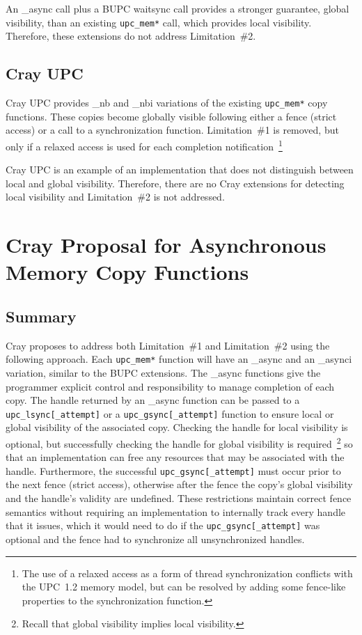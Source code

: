 \documentclass[10pt]{article}
\def \memstar {{\tt upc\_mem*}}
\def \gsync  {{\tt upc\_gsync[\_attempt]}}
\def \lsync  {{\tt upc\_lsync[\_attempt]}}
\begin{document}
An \_async call plus a BUPC waitsync call provides a stronger guarantee, global
visibility, than an existing \memstar{} call, which provides local visibility.
Therefore, these extensions do not address Limitation~\#2.

\subsection{Cray UPC}

Cray UPC provides \_nb and \_nbi variations of the existing \memstar{} copy
functions.  These copies become globally visible following either a fence
(strict access) or a call to a synchronization function.  Limitation~\#1 is
removed, but only if a relaxed access is used for each completion
notification~\footnote{The use of a relaxed access as a form of thread
synchronization conflicts with the UPC~1.2 memory model, but can be resolved by
adding some fence-like properties to the synchronization function.}

Cray UPC is an example of an implementation that does not distinguish between
local and global visibility.  Therefore, there are no Cray extensions for
detecting local visibility and Limitation~\#2 is not addressed.

\section{Cray Proposal for Asynchronous Memory Copy Functions}

\subsection{Summary}

Cray proposes to address both Limitation~\#1 and Limitation~\#2 using the
following approach.  Each \memstar{} function will have an \_async and an
\_asynci variation, similar to the BUPC extensions.   The \_async functions give
the programmer explicit control and responsibility to manage completion of each
copy.  The handle returned by an \_async function can be passed to a \lsync{} or
a \gsync{} function to ensure local or global visibility of the associated copy.
Checking the handle for local visibility is optional, but successfully checking
the handle for global visibility is required~\footnote{Recall that global
visibility implies local visibility.} so that an implementation can free any
resources that may be associated with the handle.  Furthermore, the successful
\gsync{} must occur prior to the next fence (strict access), otherwise after the
fence the copy's global visibility and the handle's validity are undefined.
These restrictions maintain correct fence semantics without requiring an
implementation to internally track every handle that it issues, which it would
need to do if the \gsync{} was optional and the fence had to synchronize all
unsynchronized handles.
\end{document}
